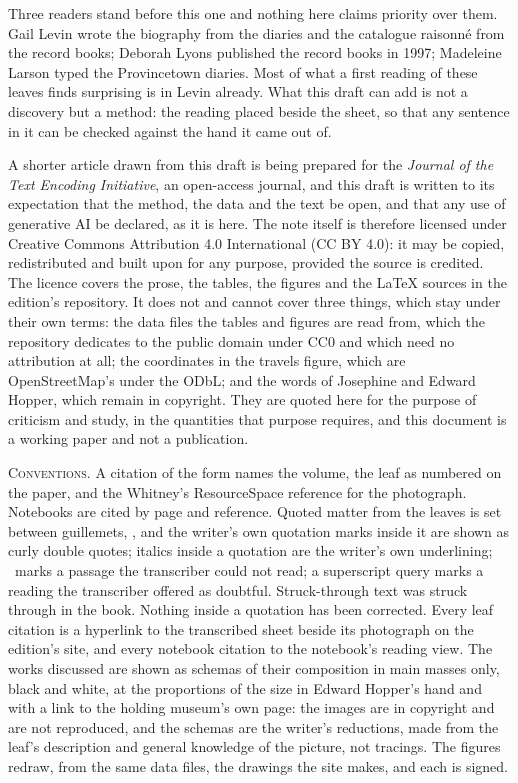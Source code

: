 Three readers stand before this one and nothing here claims priority over them. Gail Levin wrote the biography from the diaries and the catalogue raisonné from the record books; Deborah Lyons published the record books in 1997; Madeleine Larson typed the Provincetown diaries. Most of what a first reading of these leaves finds surprising is in Levin already. What this draft can add is not a discovery but a method: the reading placed beside the sheet, so that any sentence in it can be checked against the hand it came out of.

A shorter article drawn from this draft is being prepared for the \emph{Journal of the Text Encoding Initiative}, an open-access journal, and this draft is written to its expectation that the method, the data and the text be open, and that any use of generative AI be declared, as it is here. The note itself is therefore licensed under Creative Commons Attribution 4.0 International (CC BY 4.0): it may be copied, redistributed and built upon for any purpose, provided the source is credited. The licence covers the prose, the tables, the figures and the LaTeX sources in the edition's repository. It does not and cannot cover three things, which stay under their own terms: the data files the tables and figures are read from, which the repository dedicates to the public domain under CC0 and which need no attribution at all; the coordinates in the travels figure, which are OpenStreetMap's under the ODbL; and the words of Josephine and Edward Hopper, which remain in copyright. They are quoted here for the purpose of criticism and study, in the quantities that purpose requires, and this document is a working paper and not a publication.

\vspace{2em}
\noindent\textsc{Conventions.} A citation of the form  names the volume, the leaf as numbered on the paper, and the Whitney's ResourceSpace reference for the photograph. Notebooks are cited by page and reference. Quoted matter from the leaves is set between guillemets, , and the writer's own quotation marks inside it are shown as curly double quotes; italics inside a quotation are the writer's own underlining; \ill\ marks a passage the transcriber could not read; a superscript query marks a reading the transcriber offered as doubtful. Struck-through text was struck through in the book. Nothing inside a quotation has been corrected. Every leaf citation is a hyperlink to the transcribed sheet beside its photograph on the edition's site, and every notebook citation to the notebook's reading view. The works discussed are shown as schemas of their composition in main masses only, black and white, at the proportions of the size in Edward Hopper's hand and with a link to the holding museum's own page: the images are in copyright and are not reproduced, and the schemas are the writer's reductions, made from the leaf's description and general knowledge of the picture, not tracings. The figures redraw, from the same data files, the drawings the site makes, and each is signed.

